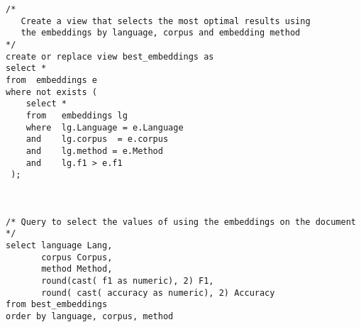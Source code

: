 \begin{verbatim}
/* 
   Create a view that selects the most optimal results using 
   the embeddings by language, corpus and embedding method 
*/
create or replace view best_embeddings as
select *
from  embeddings e
where not exists (
    select *
    from   embeddings lg
    where  lg.Language = e.Language 
    and    lg.corpus  = e.corpus 
    and    lg.method = e.Method 
    and    lg.f1 > e.f1
 );



/* Query to select the values of using the embeddings on the document */
select language Lang,
       corpus Corpus,
       method Method,
       round(cast( f1 as numeric), 2) F1,
       round( cast( accuracy as numeric), 2) Accuracy
from best_embeddings
order by language, corpus, method
\end{verbatim}
\pagebreak
